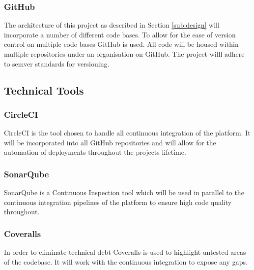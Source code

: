 \subsubsection{GitHub}
\label{sub:git}
The architecture of this project as described in Section \ref{sub:design} will incorporate a number of different code bases. To allow for the ease of version control on multiple code bases GitHub is used. All code will be housed within multiple repositories under an organisation on GitHub. The project willl adhere to semver standards for versioning.
\subsection{Technical Tools}
\subsubsection{CircleCI}
\label{sub:circle}
CircleCI is the tool chosen to handle all continuous integration of the platform. It will be incorporated into all GitHub repositories and will allow for the automation of deployments throughout the projects lifetime.
\subsubsection{SonarQube}
\label{sub:sonar}
SonarQube is a Continuous Inspection tool which will be used in parallel to the continuous integration pipelines of the platform to ensure high code quality throughout.
\subsubsection{Coveralls}
\label{sub:cover}
In order to eliminate technical debt Coveralls is used to highlight untested areas of the codebase. It will work with the continuous integration to expose any gaps.